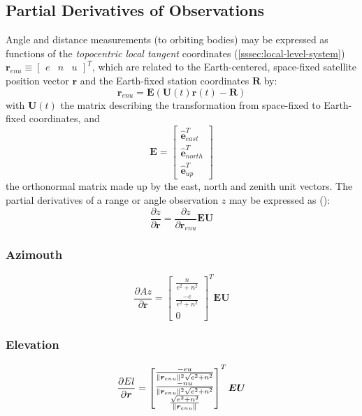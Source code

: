 \subsection{Partial Derivatives of Observations}
Angle and distance measurements (to orbiting bodies) may be expressed as 
functions of the \emph{topocentric local tangent} coordinates 
(\ref{sssec:local-level-system}) 
$\bm{r}_{enu} \equiv \begin{bmatrix}e & n & u \end{bmatrix}^T$, 
which are related to the Earth-centered, space-fixed satellite position vector 
$\bm{r}$ and the Earth-fixed station coordinates $\bm{R}$ by:
\begin{equation}
  \label{eq:mont791}
  \bm{r}_{enu} = \bm{E} \left( \bm{U}(t) \bm{r}(t) - \bm{R} \right)
\end{equation}
with $\bm{U}(t)$ the matrix describing the transformation from space-fixed to 
Earth-fixed coordinates, and
\begin{equation}
  \label{eq:mont792}
  \bm{E} = \begin{bmatrix}
    \hat{\bm{e}}^T_{east} \\
    \hat{\bm{e}}^T_{north} \\
    \hat{\bm{e}}^T_{up}
    \end{bmatrix}
\end{equation}
the orthonormal matrix made up by the east, north and zenith unit vectors. The 
partial derivatives of a range or angle observation $z$ may be expressed as 
(\cite{Montenbruck2000}):
\begin{equation}
  \label{eq:mont793}
  \frac{\partial z}{\partial \bm{r}} 
   = \frac{\partial z}{\partial \bm{r}_{enu}} \bm{E} \bm{U}
\end{equation}

\subsubsection{Azimouth}
\label{sssec:azimouth}
\begin{equation}
  \label{eq:mont798}
  \frac{\partial Az}{\partial \bm{r}} = \begin{bmatrix} 
      \frac{n}{e^2 + n^2} \\
      \frac{-e}{e^2 + n^2} \\
      0 \end{bmatrix}^T
    \bm{E} \bm{U}
\end{equation}

\subsubsection{Elevation}
\label{sssec:elevation}
\begin{equation}
  \label{eq:mont799}
  \frac{\partial El}{\partial \bm{r}} = 
    \begin{bmatrix} 
        \frac{-e u}{ \lVert\bm{r}_{enu}\rVert ^2 \sqrt{e^2 + n^2}} \\
        \frac{-n u}{ \lVert\bm{r}_{enu}\rVert ^2 \sqrt{e^2 + n^2}} \\
        \frac{\sqrt{e^2 + n^2}}{\lVert\bm{r}_{enu}\rVert} 
      \end{bmatrix}^T
    \bm{E} \bm{U}
\end{equation}
